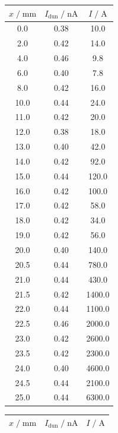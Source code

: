 \begin{table}
    \centering
    \begin{tabular}[t]{ccc|}
    \toprule
    $x\;/\; \si{\milli\meter}$ & $I_\text{dun}\;/\;\si{\nano\A}$ & $I \;/\; \si{\A}$\\
    \midrule
    0.0 & 0.38 & 10.0       \\
    2.0 & 0.42 & 14.0       \\
    4.0 & 0.46 & 9.8        \\
    6.0 & 0.40 & 7.8        \\
    8.0 & 0.42 & 16.0       \\
    10.0 & 0.44 & 24.0      \\
    11.0 & 0.42 & 20.0      \\
    12.0 & 0.38 & 18.0      \\
    13.0 & 0.40 & 42.0      \\
    14.0 & 0.42 & 92.0      \\
    15.0 & 0.44 & 120.0     \\
    16.0 & 0.42 & 100.0     \\
    17.0 & 0.42 & 58.0      \\
    18.0 & 0.42 & 34.0      \\
    19.0 & 0.42 & 56.0      \\
    20.0 & 0.40 & 140.0     \\
    20.5 & 0.44 & 780.0     \\
    21.0 & 0.44 & 430.0     \\
    21.5 & 0.42 & 1400.0    \\
    22.0 & 0.44 & 1100.0    \\
    22.5 & 0.46 & 2000.0    \\
    23.0 & 0.42 & 2600.0    \\
    23.5 & 0.42 & 2300.0    \\
    24.0 & 0.40 & 4600.0    \\
    24.5 & 0.44 & 2100.0    \\
    25.0 & 0.44 & 6300.0    \\
    \bottomrule
    \end{tabular}
    \begin{tabular}[t]{ccc|}
    \toprule
    $x\;/\; \si{\milli\meter}$ & $I_\text{dun}\;/\;\si{\nano\A}$ & $I \;/\; \si{\A}$\\
    \midrule


\end{tabular}
\end{table}
